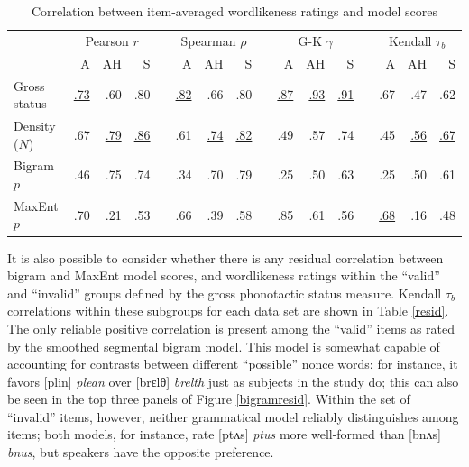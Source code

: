 \begin{table}[t]
\centering
\begin{tabular}{l rrr c rrr c rrr c rrr}
\toprule
              &         \multicolumn{3}{c}{Pearson $r$} &&     \multicolumn{3}{c}{Spearman $\rho$} && \multicolumn{3}{c}{G-K $\gamma$} && \multicolumn{3}{c}{Kendall $\tau_b$} \\
\cmidrule{2-4} \cmidrule{6-8} \cmidrule{10-12} \cmidrule{14-16}
              &           A &         AH &            S &&           A &       AH    &           S &&           A &          AH &           S &&           A &          AH & S \\
\midrule
Gross status & \uline{.73} &       {.60} &       {.80} && \uline{.82} &       {.66} &       {.80} && \uline{.87} & \uline{.93} & \uline{.91} &&       {.67} &       {.47} &       {.62} \\
Density ($N$) &       {.67} & \uline{.79} & \uline{.86} &&       {.61} & \uline{.74} & \uline{.82} &&       {.49} &       {.57} &       {.74} &&       {.45} & \uline{.56} & \uline{.67} \\
Bigram $p$ &       {.46} &       {.75} &       {.74} &&       {.34} &       {.70} &       {.79} &&       {.25} &       {.50} &       {.63} &&       {.25} &       {.50} &       {.61} \\
MaxEnt $p$ &       {.70} &       {.21} &       {.53} &&       {.66} &       {.39} &       {.58} &&       {.85} &       {.61} &       {.56} && \uline{.68} &       {.16} &       {.48} \\ 
\bottomrule
\end{tabular}
\caption{Correlation between item-averaged wordlikeness ratings and model scores}
\label{scores}
\end{table}

It is also possible to consider whether there is any residual correlation between bigram and MaxEnt model scores, and wordlikeness ratings within the ``valid'' and ``invalid'' groups defined by the gross phonotactic status measure. 
Kendall $\tau_{b}$ correlations within these subgroups for each data set are shown in Table \ref{resid}. 
The only reliable positive correlation is present among the ``valid'' items as rated by the smoothed segmental bigram model. 
This model is somewhat capable of accounting for contrasts between different ``possible'' nonce words: for instance, it favors [plin] \emph{plean} over [brɛlθ] \emph{brelth} just as subjects in the \citet{Albright2007} study do; this can also be seen in the top three panels of Figure \ref{bigramresid}.
Within the set of ``invalid'' items, however, neither grammatical model reliably distinguishes among items; both models, for instance, rate [ptʌs] \emph{ptus} more well-formed than [bnʌs] \emph{bnus}, but speakers have the opposite preference.

